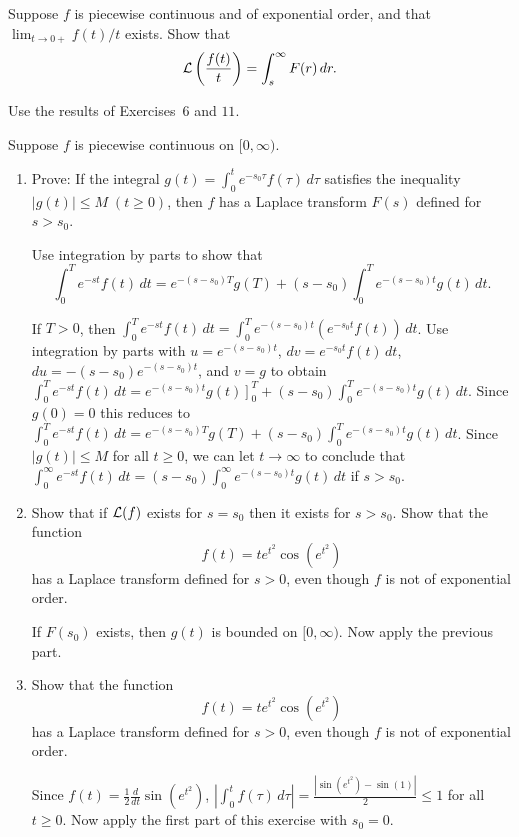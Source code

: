 \documentclass{ximera}
\begin{document}
\begin{problem}\label{exer:8.1.13}
Suppose $f$ is piecewise continuous and of exponential
order, and that $\lim_{t\to 0+} f(t)/t$ exists.  Show that
$$
{\cal L}\left(\frac{f(t)}{t}\right)=\int^\infty_s F(r)\,dr.
$$
\begin{hint}
    Use  the results of Exercises~$6$ and $11$.
\end{hint}
\end{problem}

\begin{problem}\label{exer:8.1.14}
Suppose $f$ is piecewise continuous on $[0,\infty)$.
\begin{enumerate}
\item %
Prove: If the integral $g(t)=\int^t_0 e^{-s_0\tau} f(\tau)\,d\tau$
satisfies the inequality $|g(t)|\le M\; (t\ge 0)$, then $f$ has a
Laplace transform $F(s)$ defined for $s>s_0$.

\begin{hint}
Use integration by
parts to show that
$$
\int_0^T e^{-st}f(t)\,dt = e^{-(s-s_0)T}g(T)
+(s-s_0)\int_0^Te^{-(s-s_0)t}g(t)\,dt.
$$
\end{hint}

\begin{solution}
If $T>0$, then
$\int_0^Te^{-st}f(t)\,dt=\int_0^Te^{-(s-s_0)t}(e^{-s_0t}f(t))\,dt$.
Use integration by parts with $u=e^{-(s-s_0)t}$,
$dv=e^{-s_0t}f(t)\,dt$, $du=-(s-s_0)e^{-(s-s_0)t}$, and $v=g$ to obtain
$\int_0^T e^{-st}f(t)\,dt = e^{-(s-s_0)t}g(t)\left. \right]_0^T
+(s-s_0)\int_0^Te^{-(s-s_0)t}g(t)\,dt$. Since $g(0)=0$ this reduces to
$\int_0^T e^{-st}f(t)\,dt = e^{-(s-s_0)T}g(T)
+(s-s_0)\int_0^Te^{-(s-s_0)t}g(t)\,dt$. Since $|g(t)|\le M$ for all
$t\ge0$, we can let $t\to\infty$ to conclude that $\int_0^\infty
e^{-st}f(t)\,dt = (s-s_0)\int_0^\infty e^{-(s-s_0)t}g(t)\,dt$ if
$s>s_0$.
\end{solution}

\item\label{exer:8.1.14b} %
 Show that if ${\cal L}(f)$ exists for
$s=s_0$ then it exists for $s>s_0$.
Show that the function
$$
f(t)=te^{t^2}\cos(e^{t^2})
$$
has a Laplace transform defined for $s>0$, even though $f$ is not of exponential order.

\begin{solution}
If $F(s_0)$ exists, then $g(t)$ is bounded on $[0,\infty)$.
Now apply the previous part.
\end{solution}

\item\label{exer:8.1.14c} %
Show that the function
$$
f(t)=te^{t^2}\cos(e^{t^2})
$$
has a Laplace transform defined for $s>0$, even though $f$ is not of exponential order.

\begin{solution}
Since  $f(t)=\frac{1}{2}\frac{d}{dt}\sin(e^{t^2})$,
$\left|\int_0^tf(\tau)\,d\tau\right|=\frac{|\sin(e^{t^2})-\sin(1)|}{2}\le1$
for all $t\ge0$. Now apply the first part of this exercise with $s_0=0$.
\end{solution}
\end{enumerate}
\end{problem}
\end{document}
